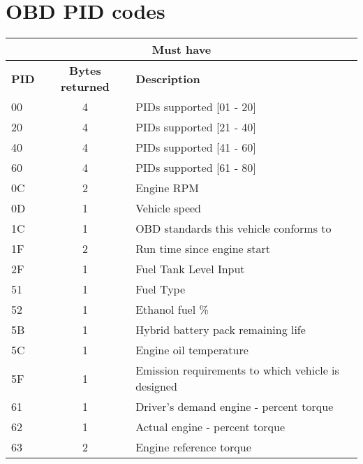 \section{OBD PID codes}
\begin{longtable}{|l|c|p{10cm}|}
    \hline
    \multicolumn{3}{|c|}{\textbf{Must have}}                                \\ \hline
    \textbf{PID} & \textbf{Bytes returned} & \textbf{Description}           \\ \hline
    00 & 4  & PIDs supported [01 - 20]                                      \\ \hline
    20 & 4  & PIDs supported [21 - 40]                                      \\ \hline
    40 & 4  & PIDs supported [41 - 60]                                      \\ \hline
    60 & 4  & PIDs supported [61 - 80]                                      \\ \hline
    0C & 2  & Engine RPM                                                    \\ \hline
    0D & 1  & Vehicle speed                                                 \\ \hline
    1C & 1  & OBD standards this vehicle conforms to                        \\ \hline
    1F & 2  & Run time since engine start                                   \\ \hline
    2F & 1  & Fuel Tank Level Input                                         \\ \hline
    51 & 1  & Fuel Type                                                     \\ \hline
    52 & 1  & Ethanol fuel \%                                               \\ \hline
    5B & 1  & Hybrid battery pack remaining life                            \\ \hline
    5C & 1  & Engine oil temperature                                        \\ \hline
    5F & 1  & Emission requirements to which vehicle is designed            \\ \hline
    61 & 1  & Driver's demand engine - percent torque                       \\ \hline
    62 & 1  & Actual engine - percent torque                                \\ \hline
    63 & 2  & Engine reference torque                                       \\ \hline

\end{longtable}

